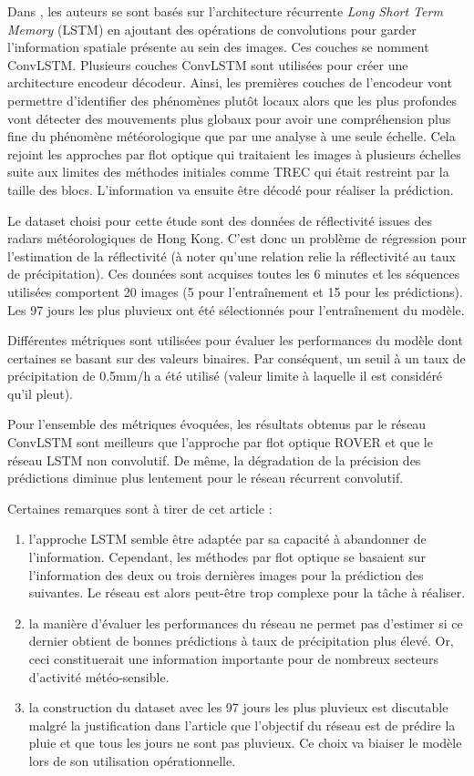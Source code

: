 \documentclass[12pt,a4paper,french]{article}
\begin{document}
Dans \cite{shi2015convolutional}, les auteurs se sont basés sur l'architecture récurrente \textit{Long Short Term Memory} (LSTM) en ajoutant des opérations de convolutions pour garder l'information spatiale présente au sein des images. Ces couches se nomment ConvLSTM. 
Plusieurs couches ConvLSTM sont utilisées pour créer une architecture encodeur décodeur. Ainsi, les premières couches de l'encodeur vont permettre d'identifier des phénomènes plutôt locaux alors que les plus profondes vont détecter des mouvements plus globaux pour avoir une compréhension plus fine du phénomène météorologique que par une analyse à une seule échelle. Cela rejoint les approches par flot optique qui traitaient les images à plusieurs échelles suite aux limites des méthodes initiales comme TREC qui était restreint par la taille des blocs. L'information va ensuite être décodé pour réaliser la prédiction. \newline

Le dataset choisi pour cette étude sont des données de réflectivité issues des radars météorologiques de Hong Kong. C'est donc un problème de régression pour l'estimation de la réflectivité (à noter qu'une relation relie la réflectivité au taux de précipitation). Ces données sont acquises toutes les 6 minutes et les séquences utilisées comportent 20 images (5 pour l'entraînement et 15 pour les prédictions). Les 97 jours les plus pluvieux ont été sélectionnés pour l'entraînement du modèle. 

Différentes métriques sont utilisées pour évaluer les performances du modèle dont certaines se basant sur des valeurs binaires. Par conséquent, un seuil à un taux de précipitation de 0.5mm/h a été utilisé (valeur limite à laquelle il est considéré qu'il pleut).

Pour l'ensemble des métriques évoquées, les résultats obtenus par le réseau ConvLSTM sont meilleurs que l'approche par flot optique ROVER et que le réseau LSTM non convolutif. De même, la dégradation de la précision des prédictions diminue plus lentement pour le réseau récurrent convolutif. 
\newline

Certaines remarques sont à tirer de cet article : 
\begin{enumerate}
    \item l'approche LSTM semble être adaptée par sa capacité à abandonner de l'information. Cependant, les méthodes par flot optique se basaient sur l'information des deux ou trois dernières images pour la prédiction des suivantes. Le réseau est alors peut-être trop complexe pour la tâche à réaliser.
    \item la manière d'évaluer les performances du réseau ne permet pas d'estimer si ce dernier obtient de bonnes prédictions à taux de précipitation plus élevé. Or, ceci constituerait une information importante pour de nombreux secteurs d'activité météo-sensible.
    \item la construction du dataset avec les 97 jours les plus pluvieux est discutable malgré la justification dans l'article que l'objectif du réseau est de prédire la pluie et que tous les jours ne sont pas pluvieux. Ce choix va biaiser le modèle lors de son utilisation opérationnelle. 
\end{enumerate}
\end{document}
